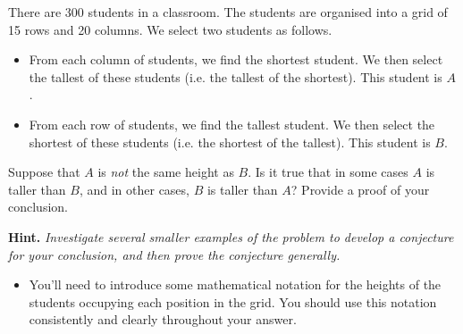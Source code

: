 \documentclass[12pt]{article}
\begin{document}

\begin{question}
There are 300 students in a classroom. The students are organised into a grid of 15 rows and 20 columns. We select two students as follows. \begin{itemize}
    \item From each column of students, we find the shortest student. We then select the tallest of these students (i.e. the tallest of the shortest). This student is  $A$.
    \item From each row of students, we find the tallest student. We then select the shortest of these students (i.e. the shortest of the tallest). This student is $B$.
\end{itemize}

Suppose that $A$ is \emph{not} the same height as $B$. Is it true that in some cases $A$ is taller than $B$, and in other cases, $B$ is taller than $A$? Provide a proof of your conclusion. 

{\bfseries Hint.} {\em Investigate several smaller examples of the problem to develop a conjecture for your conclusion, and then prove the conjecture generally.}
\end{question}
\begin{rubric}

\begin{itemize}
    \item \clarity You'll need to introduce some mathematical notation for the heights of the students occupying each position in the grid. You should use this notation consistently and clearly throughout your answer.
\end{itemize}
\end{rubric}
\clearpage
\begin{solution}
\end{solution}
\begin{attribution}
\end{attribution}
\end{document}
